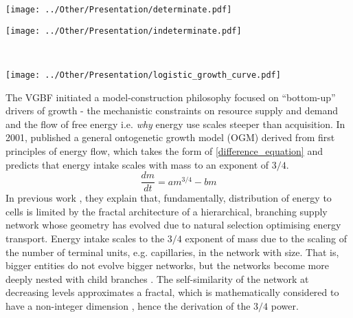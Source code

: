 \documentclass[a4paper]{article} %
\begin{document}
        \begin{center}
            \begin{minipage}{0.33\linewidth}
            \texttt{[image: ../Other/Presentation/determinate.pdf]}
            \label{determinate}
            \end{minipage}%
            \begin{minipage}{0.33\linewidth}
            \texttt{[image: ../Other/Presentation/indeterminate.pdf]}  
            \label{indeterminate}
            \end{minipage}\\
            \begin{minipage}{0.7\linewidth}
                \texttt{[image: ../Other/Presentation/logistic\_growth\_curve.pdf]}  
                \label{logistic_growth}
                \end{minipage}
        \end{center}
        The VGBF initiated a model-construction philosophy focused on ``bottom-up'' drivers of growth - the mechanistic constraints on resource supply and demand and the flow of free energy i.e. \textit{why} energy use scales steeper than acquisition. In 2001, \cite{West2001} published a general ontogenetic growth model (OGM) derived from first principles of energy flow, which takes the form of \eqref{difference_equation} and predicts that energy intake scales with mass to an exponent of $3/4$.  
        \begin{equation}
            \frac{dm}{dt} = am^{3/4} - bm \label{west_ogm}
        \end{equation}
        In previous work \autocite{West1997}, they explain that, fundamentally, distribution of energy to cells is limited by the fractal architecture of a hierarchical, branching supply network whose geometry has evolved due to natural selection optimising energy transport. Energy intake scales to the $3/4$ exponent of mass due to the scaling of the number of terminal units, e.g. capillaries, in the network with size. That is, bigger entities do not evolve bigger networks, but the networks become more deeply nested with child branches \autocite{West1997}. The self-similarity of the network at decreasing levels approximates a fractal, which is mathematically considered to have a non-integer dimension \autocite{Hausdorff1918, Mandelbrot1982}, hence the derivation of the $3/4$ power. 
        
\end{document}
